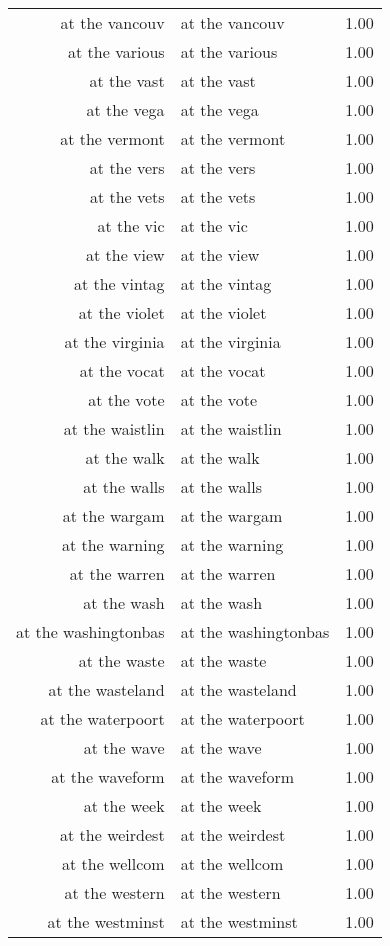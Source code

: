 \begin{table}[ht]
\begin{tabular}{rlr}
  at the vancouv & at the vancouv & 1.00 \\ 
  at the various & at the various & 1.00 \\ 
  at the vast & at the vast & 1.00 \\ 
  at the vega & at the vega & 1.00 \\ 
  at the vermont & at the vermont & 1.00 \\ 
  at the vers & at the vers & 1.00 \\ 
  at the vets & at the vets & 1.00 \\ 
  at the vic & at the vic & 1.00 \\ 
  at the view & at the view & 1.00 \\ 
  at the vintag & at the vintag & 1.00 \\ 
  at the violet & at the violet & 1.00 \\ 
  at the virginia & at the virginia & 1.00 \\ 
  at the vocat & at the vocat & 1.00 \\ 
  at the vote & at the vote & 1.00 \\ 
  at the waistlin & at the waistlin & 1.00 \\ 
  at the walk & at the walk & 1.00 \\ 
  at the walls & at the walls & 1.00 \\ 
  at the wargam & at the wargam & 1.00 \\ 
  at the warning & at the warning & 1.00 \\ 
  at the warren & at the warren & 1.00 \\ 
  at the wash & at the wash & 1.00 \\ 
  at the washingtonbas & at the washingtonbas & 1.00 \\ 
  at the waste & at the waste & 1.00 \\ 
  at the wasteland & at the wasteland & 1.00 \\ 
  at the waterpoort & at the waterpoort & 1.00 \\ 
  at the wave & at the wave & 1.00 \\ 
  at the waveform & at the waveform & 1.00 \\ 
  at the week & at the week & 1.00 \\ 
  at the weirdest & at the weirdest & 1.00 \\ 
  at the wellcom & at the wellcom & 1.00 \\ 
  at the western & at the western & 1.00 \\ 
  at the westminst & at the westminst & 1.00 \\ 

\end{tabular}
\end{table}
